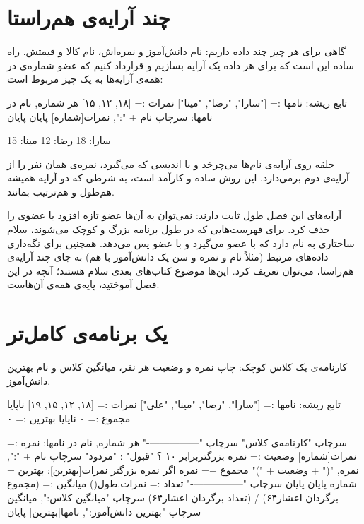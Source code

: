 \section{چند آرایه‌ی هم‌راستا}

گاهی برای هر چیز چند داده داریم: نام دانش‌آموز و نمره‌اش، نام کالا و
قیمتش. راه ساده این است که برای هر داده یک آرایه بسازیم و قرارداد
کنیم که عضو شماره‌ی  در همه‌ی آرایه‌ها به یک چیز مربوط است:

\begin{salamfa}
تابع ریشه:
    نامها := ["سارا", "رضا", "مینا"]
    نمرات := [۱۸, ۱۲, ۱۵]
    هر شماره, نام در نامها:
        سرچاپ نام + ":", نمرات[شماره]
    پایان
پایان
\end{salamfa}

\begin{outputfa}
سارا: 18
رضا: 12
مینا: 15
\end{outputfa}

حلقه روی آرایه‌ی نام‌ها می‌چرخد و با اندیسی که می‌گیرد، نمره‌ی همان نفر را
از آرایه‌ی دوم برمی‌دارد. این روش ساده و کارآمد است، به شرطی که دو آرایه
همیشه هم‌طول و هم‌ترتیب بمانند.

\begin{deep}
آرایه‌های این فصل طول ثابت دارند: نمی‌توان به آن‌ها عضو تازه افزود یا عضوی
را حذف کرد. برای فهرست‌هایی که در طول برنامه بزرگ و کوچک می‌شوند، سلام
ساختاری به نام  دارد که با  عضو می‌گیرد و با
 عضو پس می‌دهد. همچنین برای نگه‌داری داده‌های مرتبط (مثلاً
نام و نمره و سن یک دانش‌آموز با هم) به جای چند آرایه‌ی هم‌راستا، می‌توان
 تعریف کرد. این‌ها موضوع کتاب‌های بعدی سلام هستند؛ آنچه
در این فصل آموختید، پایه‌ی همه‌ی آن‌هاست.
\end{deep}

\section{یک برنامه‌ی کامل‌تر}

کارنامه‌ی یک کلاس کوچک: چاپ نمره و وضعیت هر نفر، میانگین کلاس و نام
بهترین دانش‌آموز.

\begin{salamfa}
تابع ریشه:
    نامها := ["سارا", "رضا", "مینا", "علی"]
    نمرات := [۱۸, ۱۲, ۱۵, ۱۹]
    ناپایا مجموع := ۰
    ناپایا بهترین := ۰

    سرچاپ "کارنامه‌ی کلاس"
    سرچاپ "----------------"
    هر شماره, نام در نامها:
        نمره := نمرات[شماره]
        وضعیت := نمره بزرگتربرابر ۱۰ ؟ "قبول" : "مردود"
        سرچاپ نام + ":", نمره, "(" + وضعیت + ")"
        مجموع += نمره
        اگر نمره بزرگتر نمرات[بهترین]: بهترین = شماره پایان
    پایان
    سرچاپ "----------------"
    تعداد := نمرات.طول()
    میانگین := (مجموع برگردان اعشار۶۴) / (تعداد برگردان اعشار۶۴)
    سرچاپ "میانگین کلاس:", میانگین
    سرچاپ "بهترین دانش‌آموز:", نامها[بهترین]
پایان
\end{salamfa}

